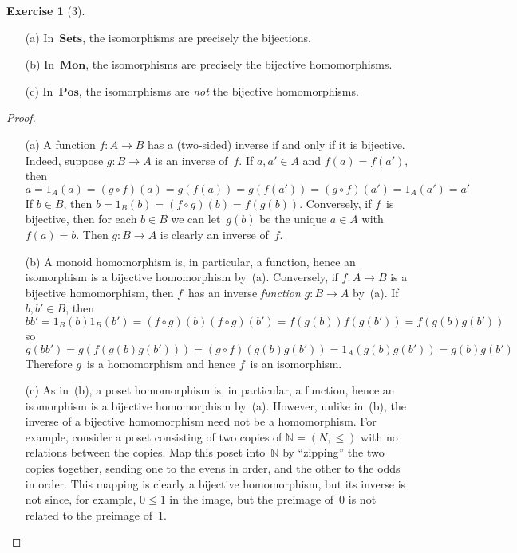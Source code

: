 \documentclass[letterpaper,12pt]{article}
\newcommand{\N}{\mathbb{N}}
\newcommand{\after}{\circ}
\newcommand{\cat}[1]{\mathbf{#1}}
\newcommand{\2}{\cat{2}}
\newcommand{\Sets}{\cat{Sets}}
\newcommand{\Mon}{\cat{Mon}}
\newcommand{\Pos}{\cat{Pos}}
\theoremstyle{definition}
\newtheorem*{exer}{Exercise}
\theoremstyle{remark}
\theoremstyle{direction}
\begin{document}
\begin{exer}[3]\
\begin{enumerate}[itemsep=0pt]
\item[(a)] In~\(\Sets\), the isomorphisms are precisely the bijections.
\item[(b)] In~\(\Mon\), the isomorphisms are precisely the bijective homomorphisms.
\item[(c)] In~\(\Pos\), the isomorphisms are \emph{not} the bijective homomorphisms.
\end{enumerate}
\begin{proof}\
\begin{enumerate}[itemsep=0pt]
\item[(a)] A function \(f:A\to B\) has a (two-sided) inverse if and only if it is bijective. Indeed, suppose \(g:B\to A\) is an inverse of~\(f\). If \(a,a'\in A\) and \(f(a)=f(a')\), then
\[a=1_A(a)=(g\after f)(a)=g(f(a))=g(f(a'))=(g\after f)(a')=1_A(a')=a'\]
If \(b\in B\), then \(b=1_B(b)=(f\after g)(b)=f(g(b))\). Conversely, if \(f\)~is bijective, then for each \(b\in B\) we can let~\(g(b)\) be the unique \(a\in A\) with \(f(a)=b\). Then \(g:B\to A\) is clearly an inverse of~\(f\).
\item[(b)] A monoid homomorphism is, in particular, a function, hence an isomorphism is a bijective homomorphism by~(a). Conversely, if \(f:A\to B\) is a bijective homomorphism, then \(f\)~has an inverse \emph{function} \(g:B\to A\) by~(a). If \(b,b'\in B\), then
\[bb'=1_B(b)1_B(b')=(f\after g)(b)(f\after g)(b')=f(g(b))f(g(b'))=f(g(b)g(b'))\]
so
\[g(bb')=g(f(g(b)g(b')))=(g\after f)(g(b)g(b'))=1_A(g(b)g(b'))=g(b)g(b')\]
Therefore \(g\)~is a homomorphism and hence \(f\)~is an isomorphism.
\item[(c)] As in~(b), a poset homomorphism is, in particular, a function, hence an isomorphism is a bijective homomorphism by~(a). However, unlike in~(b), the inverse of a bijective homomorphism need not be a homomorphism. For example, consider a poset consisting of two copies of \(\N=(N,\le)\) with no relations between the copies. Map this poset into~\(\N\) by ``zipping'' the two copies together, sending one to the evens in order, and the other to the odds in order. This mapping is clearly a bijective homomorphism, but its inverse is not since, for example, \(0\le 1\) in the image, but the preimage of~\(0\) is not related to the preimage of~\(1\).\qedhere
\end{enumerate}
\end{proof}
\end{exer}
\end{document}
